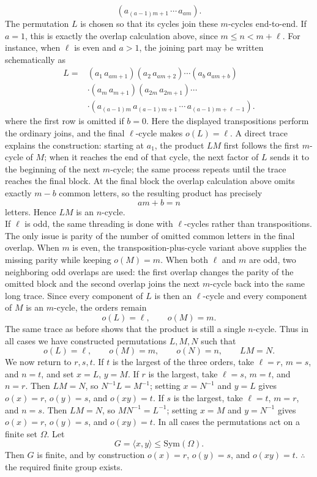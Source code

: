 \documentclass[../Odyssey_Project.tex]{subfiles}
\begin{document}
\begin{solution}
\[      (a_{(a-1)m+1}\,\cdots\,a_{am}).
\]
The permutation \(L\) is chosen so that its cycles join these \(m\)-cycles end-to-end. If \(a=1\), this is exactly the overlap calculation above, since \(m\leq n<m+\ell\). For instance, when \(\ell\) is even and \(a>1\), the joining part may be written schematically as
\[
\begin{aligned}
    L={}&(a_1\,a_{am+1})(a_2\,a_{am+2})\cdots(a_b\,a_{am+b})  \\
       &\cdot (a_m\,a_{m+1})(a_{2m}\,a_{2m+1})\cdots \\
       &\cdot
       (a_{(a-1)m}\,a_{(a-1)m+1}\,\cdots\,a_{(a-1)m+\ell-1}).
\end{aligned}
\]
where the first row is omitted if \(b=0\). Here the displayed transpositions perform the ordinary joins, and the final \(\ell\)-cycle makes \(o(L)=\ell\). A direct trace explains the construction: starting at \(a_1\), the product \(LM\) first follows the first \(m\)-cycle of \(M\); when it reaches the end of that cycle, the next factor of \(L\) sends it to the beginning of the next \(m\)-cycle; the same process repeats until the trace reaches the final block. At the final block the overlap calculation above omits exactly \(m-b\) common letters, so the resulting product has precisely
\[
    am+b=n
\]
letters. Hence \(LM\) is an \(n\)-cycle. \\
If \(\ell\) is odd, the same threading is done with \(\ell\)-cycles rather than transpositions. The only issue is parity of the number of omitted common letters in the final overlap. When \(m\) is even, the transposition-plus-cycle variant above supplies the missing parity while keeping \(o(M)=m\). When both \(\ell\) and \(m\) are odd, two neighboring odd overlaps are used: the first overlap changes the parity of the omitted block and the second overlap joins the next \(m\)-cycle back into the same long trace. Since every component of \(L\) is then an \(\ell\)-cycle and every component of \(M\) is an \(m\)-cycle, the orders remain
\[
    o(L)=\ell,\qquad o(M)=m.
\]
The same trace as before shows that the product is still a single \(n\)-cycle. Thus in all cases we have constructed permutations \(L,M,N\) such that
\[
    o(L)=\ell,\qquad o(M)=m,\qquad o(N)=n,\qquad LM=N.
\]
We now return to \(r,s,t\). If \(t\) is the largest of the three orders, take \(\ell=r\), \(m=s\), and \(n=t\), and set \(x=L\), \(y=M\). If \(r\) is the largest, take \(\ell=s\), \(m=t\), and \(n=r\). Then \(LM=N\), so \(N^{-1}L=M^{-1}\); setting \(x=N^{-1}\) and \(y=L\) gives \(o(x)=r\), \(o(y)=s\), and \(o(xy)=t\). If \(s\) is the largest, take \(\ell=t\), \(m=r\), and \(n=s\). Then \(LM=N\), so \(MN^{-1}=L^{-1}\); setting \(x=M\) and \(y=N^{-1}\) gives \(o(x)=r\), \(o(y)=s\), and \(o(xy)=t\). In all cases the permutations act on a finite set \(\Omega\). Let
\[
    G=\langle x,y\rangle \leq \mathrm{Sym}(\Omega).
\]
Then \(G\) is finite, and by construction \(o(x)=r\), \(o(y)=s\), and \(o(xy)=t\). \(\therefore\) the required finite group exists.
\end{solution}
\end{document}
